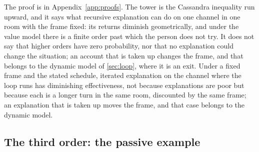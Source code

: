 The proof is in Appendix~\ref{app:proofs}. The tower is the Cassandra inequality run upward, and it says what recursive explanation can do on one channel in one room with the frame fixed: its returns diminish geometrically, and under the value model there is a finite order past which the person does not try. It does not say that higher orders have zero probability, nor that no explanation could change the situation; an account that is taken up changes the frame, and that belongs to the dynamic model of \autoref{sec:loop}, where it is an exit. Under a fixed frame and the stated schedule, iterated explanation on the channel where the loop runs has diminishing effectiveness, not because explanations are poor but because each is a longer turn in the same room, discounted by the same frame; an explanation that is taken up moves the frame, and that case belongs to the dynamic model.

\subsection{The third order: the passive example}

